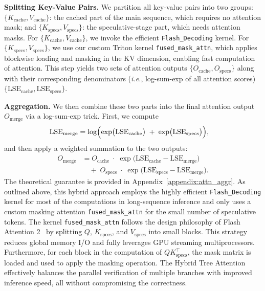 \textbf{Splitting Key-Value Pairs.}
We partition all key-value pairs into two groups: $\{K_{\mathrm{cache}}, V_{\mathrm{cache}}\}$: the cached part of the main sequence, which requires no attention mask;
and  $\{K_{\mathrm{specs}}, V_{\mathrm{specs}}\}$: the speculative-stage part, which needs attention masks. For $\{K_{\mathrm{cache}}, V_{\mathrm{cache}}\}$, we invoke the efficient \texttt{Flash\_Decoding} kernel. For $\{K_{\mathrm{specs}}, V_{\mathrm{specs}}\}$, we use our custom Triton kernel \texttt{fused\_mask\_attn}, which applies blockwise loading and masking in the KV dimension, enabling fast computation of attention.
This step yields two sets of attention outputs $\{O_{\mathrm{cache}}, O_{\mathrm{specs}}\}$ along with their corresponding denominators (\emph{i.e.}, log-sum-exp of all attention scores) $\{\mathrm{LSE}_{\mathrm{cache}}, \mathrm{LSE}_{\mathrm{specs}}\}$.

\textbf{Aggregation.}
We then combine these two parts into the final attention output $O_{\mathrm{merge}}$ via a log-sum-exp trick. First, we compute
\[
\begin{aligned}
\mathrm{LSE}_{\mathrm{merge}}
&= \log\Bigl(\exp\bigl(\mathrm{LSE}_{\mathrm{cache}}\bigr) \;+\; \exp\bigl(\mathrm{LSE}_{\mathrm{specs}}\bigr)\Bigr),
\end{aligned}
\]
and then apply a weighted summation to the two outputs:
\[
\begin{aligned}
O_{\mathrm{merge}}
&= O_{\mathrm{cache}} \;\cdot\; \exp\bigl(\mathrm{LSE}_{\mathrm{cache}} - \mathrm{LSE}_{\mathrm{merge}}\bigr)
\\
&\quad +\; O_{\mathrm{specs}} \;\cdot\; \exp\bigl(\mathrm{LSE}_{\mathrm{specs}} - \mathrm{LSE}_{\mathrm{merge}}\bigr).
\end{aligned}
\]
The theoretical guarantee is provided in Appendix~\ref{appendix:attn_aggr}.
As outlined above, this hybrid approach employs the highly efficient \texttt{Flash\_Decoding} kernel for most of the computations in long-sequence inference and only uses a custom masking attention \texttt{fused\_mask\_attn} for the small number of speculative tokens. 
The kernel \texttt{fused\_mask\_attn} follows the design philosophy of Flash Attention 2~\cite{dao2023flash} by splitting \(Q\), \(K_{\text{specs}}\), and \(V_{\text{specs}}\) into small blocks. This strategy reduces global memory I/O and fully leverages GPU streaming multiprocessors. Furthermore, for each block in the computation of \(QK_{\text{specs}}^\top\), the mask matrix is loaded and used to apply the masking operation.
The Hybrid Tree Attention effectively balances the parallel verification of multiple branches with improved inference speed, all without compromising the correctness.


